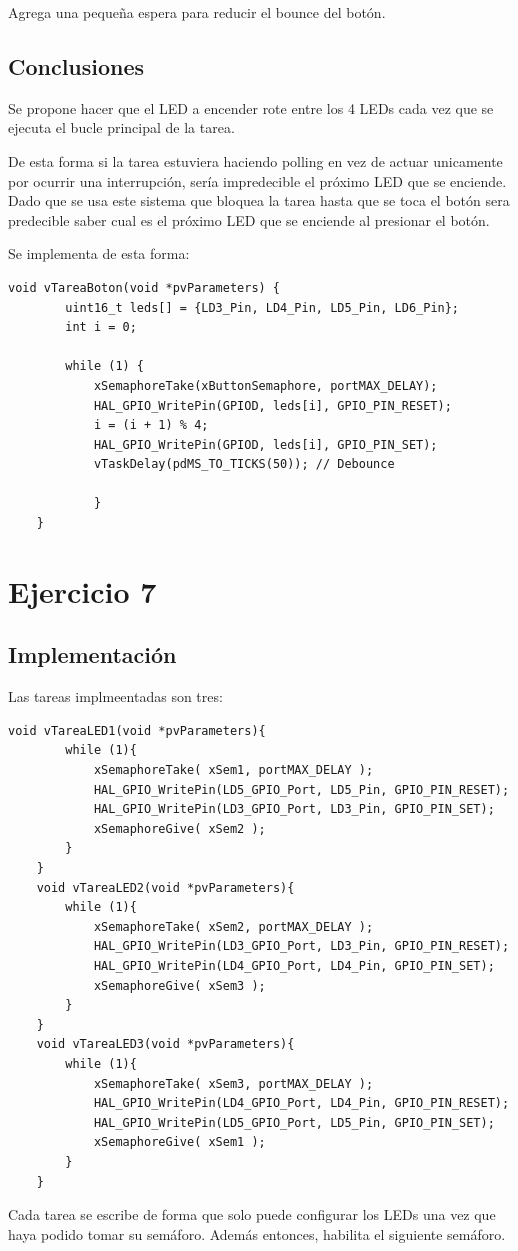 \documentclass[12pt]{article}
\begin{document}
Agrega una pequeña espera para reducir el bounce del botón.

\subsection{Conclusiones}
Se propone hacer que el LED a encender rote 
entre los 4 LEDs cada vez que se ejecuta
el bucle principal de la tarea.

De esta forma si la tarea estuviera haciendo
polling en vez de actuar unicamente por
ocurrir una interrupción, sería impredecible
el próximo LED que se enciende.
Dado que se usa este sistema que bloquea la 
tarea hasta que se toca el botón sera predecible
saber cual es el próximo LED que se 
enciende al presionar el botón.

Se implementa de esta forma:

\begin{lstlisting}[style=CStyle]
        void vTareaBoton(void *pvParameters) {
        uint16_t leds[] = {LD3_Pin, LD4_Pin, LD5_Pin, LD6_Pin};
        int i = 0;

        while (1) {
            xSemaphoreTake(xButtonSemaphore, portMAX_DELAY);
            HAL_GPIO_WritePin(GPIOD, leds[i], GPIO_PIN_RESET);
            i = (i + 1) % 4;
            HAL_GPIO_WritePin(GPIOD, leds[i], GPIO_PIN_SET);
            vTaskDelay(pdMS_TO_TICKS(50)); // Debounce

            }
    }
\end{lstlisting}

\pagebreak
\section{Ejercicio 7}
\subsection{Implementación}
Las tareas implmeentadas son tres:
\begin{lstlisting}[style=CStyle]
    void vTareaLED1(void *pvParameters){
        while (1){
            xSemaphoreTake( xSem1, portMAX_DELAY );
            HAL_GPIO_WritePin(LD5_GPIO_Port, LD5_Pin, GPIO_PIN_RESET);
            HAL_GPIO_WritePin(LD3_GPIO_Port, LD3_Pin, GPIO_PIN_SET);
            xSemaphoreGive( xSem2 );
        }
    }
    void vTareaLED2(void *pvParameters){
        while (1){
            xSemaphoreTake( xSem2, portMAX_DELAY );
            HAL_GPIO_WritePin(LD3_GPIO_Port, LD3_Pin, GPIO_PIN_RESET);
            HAL_GPIO_WritePin(LD4_GPIO_Port, LD4_Pin, GPIO_PIN_SET);
            xSemaphoreGive( xSem3 );
        }
    }
    void vTareaLED3(void *pvParameters){
        while (1){
            xSemaphoreTake( xSem3, portMAX_DELAY );
            HAL_GPIO_WritePin(LD4_GPIO_Port, LD4_Pin, GPIO_PIN_RESET);
            HAL_GPIO_WritePin(LD5_GPIO_Port, LD5_Pin, GPIO_PIN_SET);
            xSemaphoreGive( xSem1 );
        }
    }
\end{lstlisting}
Cada tarea se escribe de forma que solo puede configurar los 
LEDs una vez que haya podido tomar su semáforo. Además entonces, habilita el siguiente semáforo.
\end{document}
